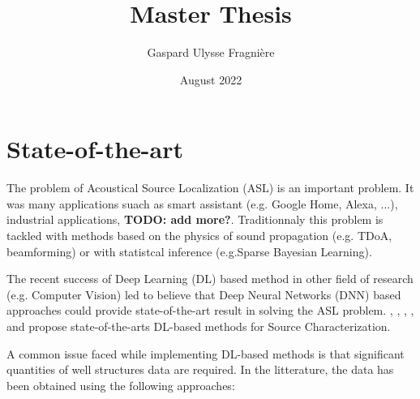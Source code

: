 \documentclass{article}
\title{Master Thesis}
\author{Gaspard Ulysse Fragnière}
\date{August 2022}
\begin{document}
\maketitle

\section{State-of-the-art}

The problem of Acoustical Source Localization (ASL) is an important problem. It was many applications suach as smart assistant (e.g. Google Home, Alexa, ...), industrial applications, \textbf{TODO: add more?}. Traditionnaly this problem is tackled with methods based on the physics of sound propagation (e.g. TDoA, beamforming) or with statistcal inference (e.g.Sparse Bayesian Learning). 

The recent success of Deep Learning (DL) based method in other field of research (e.g. Computer Vision) led to believe that Deep Neural Networks (DNN) based approaches could provide state-of-the-art result in solving the ASL problem. \cite{castellini2021neural}, \cite{kujawski2019deep}, \cite{lee2021deep}, \cite{ma2019phased}, \cite{pinto2021deconvoluting} and \cite{xu2021deep} propose state-of-the-arts DL-based methods for Source Characterization. 


A common issue faced while implementing DL-based methods is that significant quantities of well structures data are required. In the litterature, the data has been obtained using the following approaches:
\end{document}
